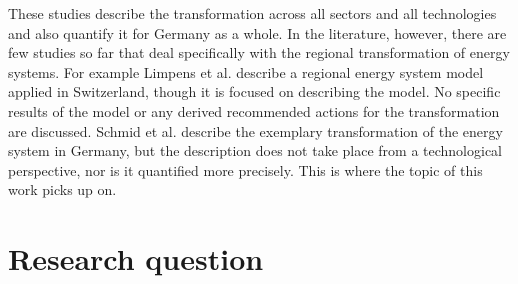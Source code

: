 These studies describe the transformation across all sectors and all technologies and also quantify it for Germany as a whole.
In the literature, however, there are few studies so far that deal specifically with the regional transformation of energy systems. For example Limpens et al. \cite{Limpens2019} describe a regional energy system model applied in Switzerland, though it is focused on describing the model. No specific results of the model or any derived recommended actions for the transformation are discussed. Schmid et al. \cite{Schmid2016} describe the exemplary transformation of the energy system in Germany, but the description does not take place from a technological perspective, nor is it quantified more precisely. This is where the topic of this work picks up on. 

\section{Research question}